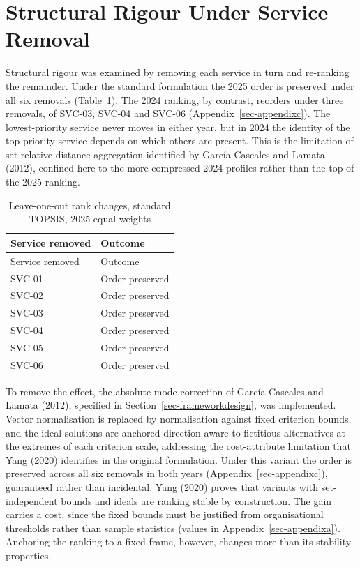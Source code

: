 \documentclass[
  12pt,
  letterpaper,
  12pt,
  oneside,
  english,
  onehalfspacing,
  headsepline]{MastersDoctoralThesis}
\begin{document}
\section{Structural Rigour Under Service
Removal}\label{sec-rankreversal}

Structural rigour was examined by removing each service in turn and
re-ranking the remainder. Under the standard formulation the 2025 order
is preserved under all six removals (Table~\ref{tbl-rankreversal}). The
2024 ranking, by contrast, reorders under three removals, of SVC-03,
SVC-04 and SVC-06 (Appendix~\ref{sec-appendixc}). The lowest-priority
service never moves in either year, but in 2024 the identity of the
top-priority service depends on which others are present. This is the
limitation of set-relative distance aggregation identified by
García-Cascales and Lamata (2012), confined here to the more compressed
2024 profiles rather than the top of the 2025 ranking.

\begin{samepage}
\footnotesize

\begin{longtable}[]{@{}ll@{}}
\caption{Leave-one-out rank changes, standard TOPSIS, 2025 equal
weights}\label{tbl-rankreversal}\tabularnewline
\toprule\noalign{}
Service removed & Outcome \\
\midrule\noalign{}
\endfirsthead
\toprule\noalign{}
Service removed & Outcome \\
\midrule\noalign{}
\endhead
\bottomrule\noalign{}
\endlastfoot
SVC-01 & Order preserved \\
SVC-02 & Order preserved \\
SVC-03 & Order preserved \\
SVC-04 & Order preserved \\
SVC-05 & Order preserved \\
SVC-06 & Order preserved \\
\end{longtable}

\end{samepage}

To remove the effect, the absolute-mode correction of García-Cascales
and Lamata (2012), specified in Section~\ref{sec-frameworkdesign}, was
implemented. Vector normalisation is replaced by normalisation against
fixed criterion bounds, and the ideal solutions are anchored
direction-aware to fictitious alternatives at the extremes of each
criterion scale, addressing the cost-attribute limitation that Yang
(2020) identifies in the original formulation. Under this variant the
order is preserved across all six removals in both years
(Appendix~\ref{sec-appendixc}), guaranteed rather than incidental. Yang
(2020) proves that variants with set-independent bounds and ideals are
ranking stable by construction. The gain carries a cost, since the fixed
bounds must be justified from organisational thresholds rather than
sample statistics (values in Appendix~\ref{sec-appendixa}). Anchoring
the ranking to a fixed frame, however, changes more than its stability
properties.
\end{document}

